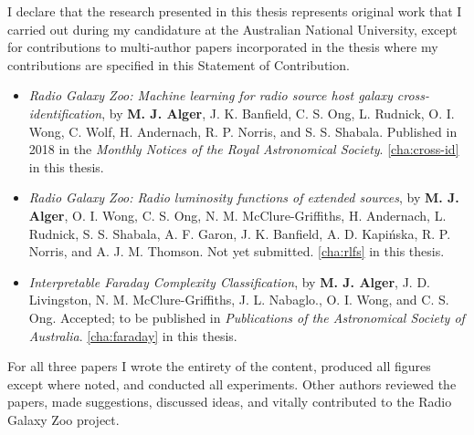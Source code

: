 \documentclass[11pt, a4paper]{book}
\begin{document}





\vspace*{4cm}
    I declare that the research presented in this thesis represents original
    work that I carried out during my candidature at the Australian National
    University, except for contributions to multi-author papers incorporated
    in the thesis where my contributions are specified in this Statement of
    Contribution.

    \begin{itemize}
      \item \emph{Radio Galaxy Zoo: Machine learning for radio source host galaxy cross-identification}, by \textbf{M. J. Alger}, J. K. Banfield, C. S. Ong, L. Rudnick, O. I. Wong, C. Wolf, H. Andernach, R. P. Norris, and S. S. Shabala. Published in 2018 in the \emph{Monthly Notices of the Royal Astronomical Society}. \autoref{cha:cross-id} in this thesis.
      \item \emph{Radio Galaxy Zoo: Radio luminosity functions of extended sources}, by \textbf{M. J. Alger}, O. I. Wong, C. S. Ong, N. M. McClure-Griffiths, H. Andernach, L. Rudnick, S. S. Shabala, A. F. Garon, J. K. Banfield, A. D. Kapi\'nska, R. P. Norris, and A. J. M. Thomson. Not yet submitted. \autoref{cha:rlfs} in this thesis.
      \item \emph{Interpretable Faraday Complexity Classification}, by \textbf{M. J. Alger}, J. D. Livingston, N. M. McClure-Griffiths, J. L. Nabaglo., O. I. Wong, and C. S. Ong. Accepted; to be published in \emph{Publications of the Astronomical Society of Australia}. \autoref{cha:faraday} in this thesis.
    \end{itemize}

    For all three papers I wrote the entirety of the content, produced all figures except where noted, and conducted all experiments. Other authors reviewed the papers, made suggestions, discussed ideas, and vitally contributed to the Radio Galaxy Zoo project.
\end{document}
